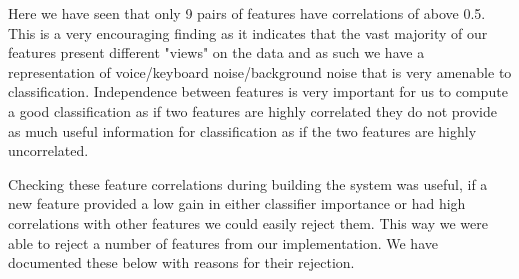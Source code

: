 \documentclass[ %
                    author={Sam Phippen},
                supervisor={Dr. Rafal Bogacz},
                     title={Real time voice activity detectors in noisy personal computing environments},
                  subtitle={},
                    degree={MEng},
                      year={2012} ]{thesis}
\begin{document}
Here we have seen that only 9 pairs of features have correlations of above 0.5.
This is a very encouraging finding as it indicates that the vast majority of
our features present different "views" on the data and as such we have a
representation of voice/keyboard noise/background noise that is very amenable
to classification. Independence between features is very important for us to
compute a good classification as if two features are highly correlated they do
not provide as much useful information for classification as if the two features
are highly uncorrelated.

Checking these feature correlations during building the system was useful, if a
new feature provided a low gain in either classifier importance or had high
correlations with other features we could easily reject them. This way we were
able to reject a number of features from our implementation. We have documented
these below with reasons for their rejection.
\end{document}
